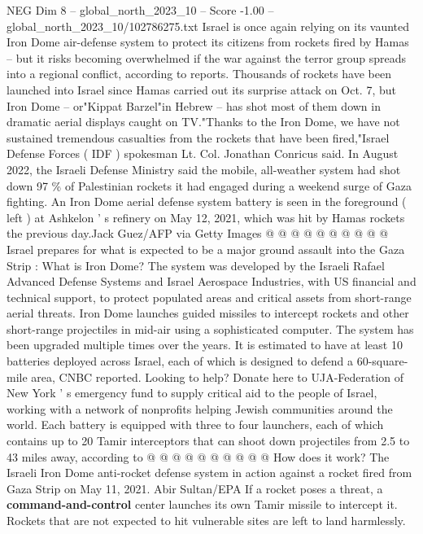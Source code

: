 \begin{textsample}{NEG Dim 8 – global\_north\_2023\_10 – Score -1.00 – global\_north\_2023\_10/102786275.txt}  \label{ex:f8_neg_214}
Israel is once again relying on its vaunted Iron Dome air-defense system to protect its citizens from rockets fired by Hamas -- but it risks becoming overwhelmed if the war against the terror group spreads into a regional conflict, according to reports.
Thousands of rockets have been launched into Israel since Hamas carried out its surprise attack on Oct. 7, but Iron Dome -- or"Kippat Barzel"in Hebrew -- has shot most of them down in dramatic aerial displays caught on TV."Thanks to the Iron Dome, we have not sustained tremendous casualties from the rockets that have been fired,"Israel Defense Forces ( IDF ) spokesman Lt.
Col.
Jonathan Conricus said.
In August 2022, the Israeli Defense Ministry said the mobile, all-weather system had shot down 97 \% of Palestinian rockets it had engaged during a weekend surge of Gaza fighting.
An Iron Dome aerial defense system battery is seen in the foreground ( left ) at Ashkelon ' s refinery on May 12, 2021, which was hit by Hamas rockets the previous day.Jack Guez/AFP via Getty Images @ @ @ @ @ @ @ @ @ @ Israel prepares for what is expected to be a major ground assault into the Gaza Strip : What is Iron Dome?
The system was developed by the Israeli Rafael Advanced Defense Systems and Israel Aerospace Industries, with US financial and technical support, to protect populated areas and critical assets from short-range aerial threats.
Iron Dome launches guided missiles to intercept rockets and other short-range projectiles in mid-air using a sophisticated computer.
The system has been upgraded multiple times over the years.
It is estimated to have at least 10 batteries deployed across Israel, each of which is designed to defend a 60-square-mile area, CNBC reported.
Looking to help?
Donate here to UJA-Federation of New York ' s emergency fund to supply critical aid to the people of Israel, working with a network of nonprofits helping Jewish communities around the world.
Each battery is equipped with three to four launchers, each of which contains up to 20 Tamir interceptors that can shoot down projectiles from 2.5 to 43 miles away, according to @ @ @ @ @ @ @ @ @ @ How does it work?
The Israeli Iron Dome anti-rocket defense system in action against a rocket fired from Gaza Strip on May 11, 2021.
Abir Sultan/EPA If a rocket poses a threat, a \textbf{command-and-control} center launches its own Tamir missile to intercept it.
Rockets that are not expected to hit vulnerable sites are left to land harmlessly.

\end{textsample}
